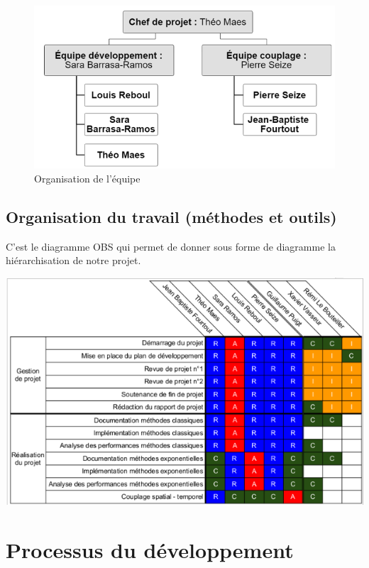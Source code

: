 \documentclass[a4paper,12pt]{report}
\theoremstyle{break}
\begin{document}
\begin{figure}[h]
\centering
    \includegraphics[scale=0.7]{images/OBS.png}
  	\caption{Organisation de l'équipe} 
   \label{fig:BTBM}
\end{figure}
\newpage

\subsection{Organisation du travail (méthodes et outils)}
    C’est le diagramme OBS qui permet de donner sous forme de diagramme la hiérarchisation de notre projet.
    
    \begin{center}
    
    \includegraphics[width=1\textwidth]{images/OB2.png}\\[1cm]

    \end{center} 
    
\section{Processus du développement}
\end{document}
